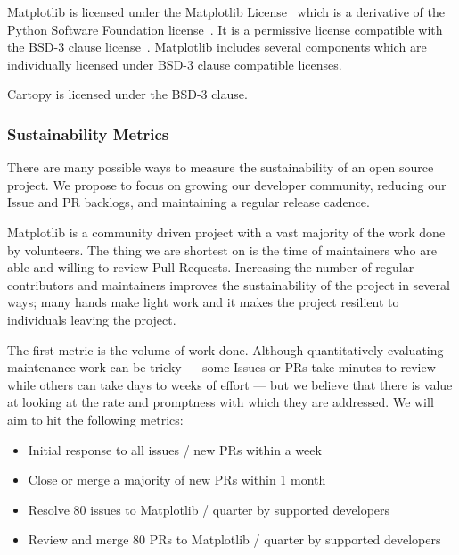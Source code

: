 \documentclass[12pt]{article}
\numberwithin{page}{section}
\begin{document}
Matplotlib is licensed under the Matplotlib License~\cite{mpl_lic} which is a
derivative of the Python Software Foundation license~\cite{psf_lic}.  It is a
permissive license compatible with the BSD-3 clause
license~\cite{jdh_bsd_opinions}.  Matplotlib includes several components which
are individually licensed under BSD-3 clause compatible licenses.

Cartopy is licensed under the BSD-3 clause.


\subsubsection{Sustainability Metrics}

There are many possible ways to measure the sustainability of an
open source project.  We propose to focus on growing our developer
community, reducing our Issue and PR backlogs, and maintaining a
regular release cadence.

Matplotlib is a community driven project with a vast majority of the
work done by volunteers.  The thing we are shortest on is the time of
maintainers who are able and willing to review Pull Requests.
Increasing the number of regular contributors and maintainers improves
the sustainability of the project in several ways; many hands make
light work and it makes the project resilient to individuals leaving
the project.

The first metric is the volume of work done.  Although quantitatively
evaluating maintenance work can be tricky --- some Issues or PRs take minutes
to review while others can take days to weeks of effort --- but we believe that
there is value at looking at the rate and promptness with which they are
addressed.  We will aim to hit the following metrics:
\begin{itemize}[noitemsep]
\item Initial response to all issues / new PRs within a week  %
\item Close or merge a majority of new PRs within 1 month     %
\item Resolve 80 issues to Matplotlib / quarter by supported developers       %
\item Review and merge 80 PRs to Matplotlib / quarter by supported developers %
\end{itemize}
\end{document}
